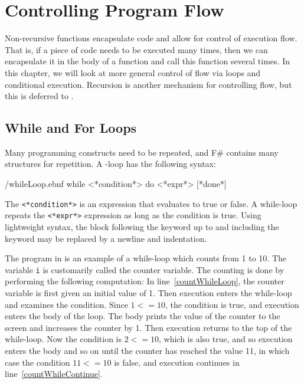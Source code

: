 \chapter{Controlling Program Flow}
\label{chap:flow}
Non-recursive functions encapsulate code and allow for control of execution flow. That is, if a piece of code needs to be executed many times, then we can encapsulate it in the body of a function and call this function several times. In this chapter, we will look at more general control of flow via loops and conditional execution. Recursion is another mechanism for controlling flow, but this is deferred to .

\section{While and For Loops}
Many programming constructs need to be repeated, and F\# contains many structures for repetition. A -loop has the following syntax:
%
\begin{verbatimwrite}{\ebnf/whileLoop.ebnf}
while <*condition*> do <*expr*> [*done*]
\end{verbatimwrite}
%
The  \lstinline[language=syntax]{<*condition*>} is an expression that evaluates to true or false. A while-loop repeats the \lstinline[language=syntax]{<*expr*>} expression as long as the condition is true.  Using lightweight syntax, the block following the  keyword up to and including the  keyword may be replaced by a newline and indentation.

The program in  is an example of a while-loop which counts from 1 to 10.
%
%
The variable \lstinline{i} is customarily called the counter variable. The counting is done by performing the following computation: In line~\ref{countWhileLoop}, the counter variable is first given an initial value of 1. Then execution enters the while-loop and examines the condition. Since $1 <= 10$, the condition is true, and execution enters the body of the loop. The body prints the value of the counter to the screen and increases the counter by 1. Then execution returns to the top of the while-loop. Now the condition is $2 <= 10$, which is also true, and so execution enters the body and so on until the counter has reached the value 11, in which case the condition $11 <= 10$ is false, and execution continues in line~\ref{countWhileContinue}.

